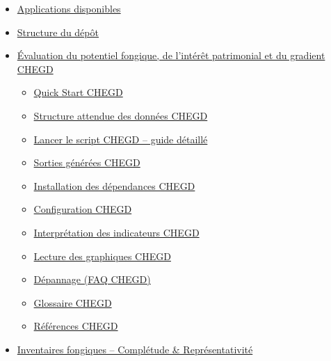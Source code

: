 \begin{itemize}
\tightlist
\item
  \hyperref[-applications-disponibles]{Applications disponibles}
\item
  \hyperref[-structure-du-dux5cux25C3ux5cux25A9pux5cux25C3ux5cux25B4t]{Structure
  du dépôt}
\item
  \hyperref[-evaluation-du-potentiel-fongique-de-lintux5cux25C3ux5cux25A9rux5cux25C3ux5cux25AAt-patrimonial-et-du-gradient-chegd]{Évaluation
  du potentiel fongique, de l'intérêt patrimonial et du gradient CHEGD}

  \begin{itemize}
  \tightlist
  \item
    \hyperref[-quick-start-chegd]{Quick Start CHEGD}
  \item
    \hyperref[-structure-attendue-des-donnux5cux25C3ux5cux25A9es-chegd]{Structure
    attendue des données CHEGD}
  \item
    \hyperref[-lancer-le-script-chegd--guide-dux5cux25C3ux5cux25A9taillux5cux25C3ux5cux25A9]{Lancer
    le script CHEGD -- guide détaillé}
  \item
    \hyperref[-sorties-gux5cux25C3ux5cux25A9nux5cux25C3ux5cux25A9rux5cux25C3ux5cux25A9es-chegd]{Sorties
    générées CHEGD}
  \item
    \hyperref[-installation-des-dux5cux25C3ux5cux25A9pendances-chegd]{Installation
    des dépendances CHEGD}
  \item
    \hyperref[-configuration-chegd]{Configuration CHEGD}
  \item
    \hyperref[-interprux5cux25C3ux5cux25A9tation-des-indicateurs-chegd]{Interprétation
    des indicateurs CHEGD}
  \item
    \hyperref[-lecture-des-graphiques-chegd]{Lecture des graphiques
    CHEGD}
  \item
    \hyperref[-dux5cux25C3ux5cux25A9pannage-faq-chegd]{Dépannage (FAQ
    CHEGD)}
  \item
    \hyperref[-glossaire-chegd]{Glossaire CHEGD}
  \item
    \hyperref[-rux5cux25C3ux5cux25A9fux5cux25C3ux5cux25A9rences-chegd]{Références
    CHEGD}
  \end{itemize}
\item
  \hyperref[-inventaires-fongiques--complux5cux25C3ux5cux25A9tude--reprux5cux25C3ux5cux25A9sentativitux5cux25C3ux5cux25A9]{Inventaires
  fongiques -- Complétude \& Représentativité}


\end{itemize}
